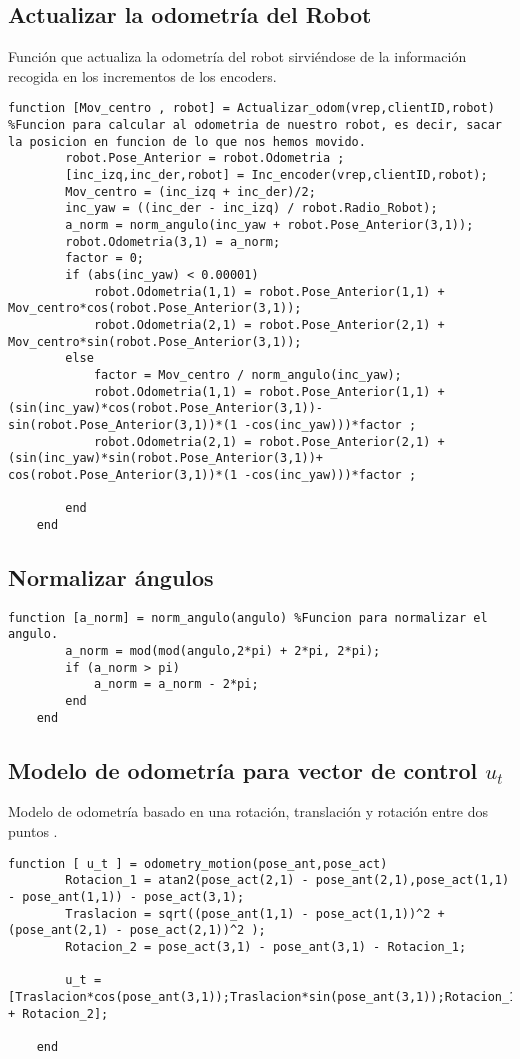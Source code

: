 \subsection{Actualizar la odometría del Robot}
Función que actualiza la odometría del robot sirviéndose de la información recogida en los incrementos de los encoders.
\begin{lstlisting}[frame=single]
function [Mov_centro , robot] = Actualizar_odom(vrep,clientID,robot) %Funcion para calcular al odometria de nuestro robot, es decir, sacar la posicion en funcion de lo que nos hemos movido.
        robot.Pose_Anterior = robot.Odometria ;
        [inc_izq,inc_der,robot] = Inc_encoder(vrep,clientID,robot);
        Mov_centro = (inc_izq + inc_der)/2;
        inc_yaw = ((inc_der - inc_izq) / robot.Radio_Robot);
        a_norm = norm_angulo(inc_yaw + robot.Pose_Anterior(3,1));
        robot.Odometria(3,1) = a_norm;
        factor = 0;
        if (abs(inc_yaw) < 0.00001)
            robot.Odometria(1,1) = robot.Pose_Anterior(1,1) + Mov_centro*cos(robot.Pose_Anterior(3,1));
            robot.Odometria(2,1) = robot.Pose_Anterior(2,1) + Mov_centro*sin(robot.Pose_Anterior(3,1));
        else
            factor = Mov_centro / norm_angulo(inc_yaw);
            robot.Odometria(1,1) = robot.Pose_Anterior(1,1) + (sin(inc_yaw)*cos(robot.Pose_Anterior(3,1))- sin(robot.Pose_Anterior(3,1))*(1 -cos(inc_yaw)))*factor ;
            robot.Odometria(2,1) = robot.Pose_Anterior(2,1) + (sin(inc_yaw)*sin(robot.Pose_Anterior(3,1))+ cos(robot.Pose_Anterior(3,1))*(1 -cos(inc_yaw)))*factor ;
            
        end
    end
\end{lstlisting}
\subsection{Normalizar ángulos}
\begin{lstlisting}[frame=single]
function [a_norm] = norm_angulo(angulo) %Funcion para normalizar el angulo.
        a_norm = mod(mod(angulo,2*pi) + 2*pi, 2*pi);
        if (a_norm > pi)
            a_norm = a_norm - 2*pi;
        end
    end
\end{lstlisting}
\subsection{Modelo de odometría para vector de control $u_{t}$ \cite{thrun_probabilistic_2005}}
Modelo de odometría basado en una rotación, translación y rotación entre dos puntos \cite{thrun_probabilistic_2005}.
\begin{lstlisting}[frame=single]
function [ u_t ] = odometry_motion(pose_ant,pose_act)
        Rotacion_1 = atan2(pose_act(2,1) - pose_ant(2,1),pose_act(1,1) - pose_ant(1,1)) - pose_act(3,1);
        Traslacion = sqrt((pose_ant(1,1) - pose_act(1,1))^2 + (pose_ant(2,1) - pose_act(2,1))^2 );
        Rotacion_2 = pose_act(3,1) - pose_ant(3,1) - Rotacion_1;

        u_t = [Traslacion*cos(pose_ant(3,1));Traslacion*sin(pose_ant(3,1));Rotacion_1 + Rotacion_2];

    end
\end{lstlisting}
